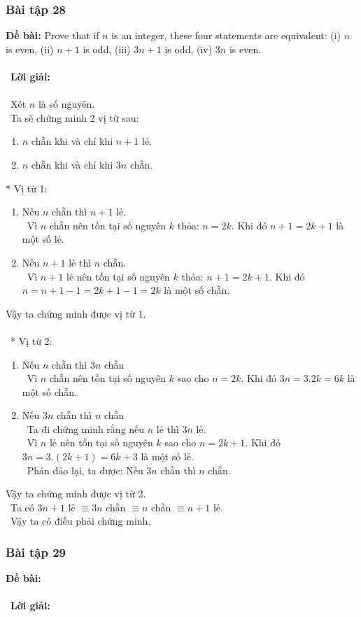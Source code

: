 \documentclass[a4paper]{article}
\begin{document}
\subsubsection{Bài tập 28}
\textbf{Đề bài: } Prove that if $n$ is an integer, these four statements are equivalent: (i) $n$ is even, (ii) $n + 1$ is odd, (iii) $3n + 1$ is odd, (iv) $3n$ is even.\\\ \\\
\textbf{Lời giải:} \\\ \\\
Xét $n$ là số nguyên. \\\
Ta sẽ chứng minh 2 vị từ sau:
\begin{enumerate}
\item $n$ chẵn khi và chỉ khi $n+1$ lẻ.
\item $n$ chẵn khi và chỉ khi $3n$ chẵn.
\end{enumerate}
* Vị từ 1: 
\begin{enumerate}
\item Nếu $n$ chẵn thì $n+1$ lẻ. \\\
Vì $n$ chẵn nên tồn tại số nguyên $k$ thỏa: $n=2k$. Khi đó $n+1=2k+1$ là một số lẻ.
\item Nếu $n+1$ lẻ thì $n$ chẵn. \\\
Vì $n+1$ lẻ nên tồn tại số nguyên $k$ thỏa: $n+1=2k+1$. Khi đó $n=n+1-1=2k+1-1=2k$ là một số chẵn.
\end{enumerate}
Vậy ta chứng minh được vị từ 1. \\\ \\\
* Vị từ 2:
\begin{enumerate}
\item Nếu $n$ chẵn thì $3n$ chẵn \\\
Vì $n$ chẵn nên tồn tại số nguyên $k$ sao cho $n=2k$. Khi đó $3n=3.2k=6k$ là một số chẵn.
\item Nếu $3n$ chẵn thì $n$ chẵn \\\
Ta đi chứng minh rằng nếu $n$ lẻ thì $3n$ lẻ. \\\
Vì $n$ lẻ nên tồn tại số nguyên $k$ sao cho $n=2k+1$. Khi đó $3n=3.(2k+1) = 6k+3$ là một số lẻ. \\\
Phản đảo lại, ta được: Nếu $3n$ chẵn thì $n$ chẵn.
\end{enumerate}
Vậy ta chứng minh được vị từ 2. \\\
Ta có $3n+1$ lẻ $\equiv 3n$ chẵn $\equiv n$ chẵn $\equiv n+1$ lẻ. \\\
Vậy ta có điều phải chứng minh. 

\clearpage
\subsubsection{Bài tập 29}
\textbf{Đề bài:} 
\\\ \\\
\textbf{Lời giải:} \\\ \\\
\clearpage
\end{document}
